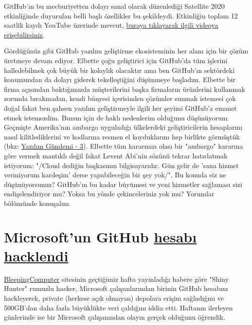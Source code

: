 \documentclass[11pt]{article}
\begin{document}
GitHub'ın bu mecburiyetten dolayı sanal olarak düzenlediği Satellite 2020
etkinliğinde duyurulan belli başlı özellikler bu şekildeydi. Etkinliğin toplam
12 saatlik kaydı YouTube üzerinde mevcut, \href{https://www.youtube.com/watch?v=FhZTPM9ysWk\&feature=emb\_title}{buraya tıklayarak ilgili videoya
erişebilirsiniz}.

Gördüğünüz gibi GitHub yazılım geliştirme ekosisteminin her alanı için bir
çözüm üretmeye devam ediyor. Elbette çoğu geliştirici için GitHub'da tüm
işlerini halledebilmek çok büyük bir kolaylık olacaktır ama ben GitHub'ın
sektördeki konumundan da dolayı giderek tekelleştiğini düşünmeye başladım.
Elbette bir firma açısından baktığımızda müşterilerini başka firmaların
ürünlerini kullanmak zorunda bırakmadan, kendi bünyesi içerisinden çözümler
sunmak istemesi çok doğal fakat ben şahsen yazılım geliştirmeyle ilgili her
şeyimi GitHub'a emanet etmek istemezdim. Bunun için de haklı nedenlerim
olduğunu düşünüyorum. Geçmişte Amerika'nın ambargo uyguladığı ülkelerdeki
geliştiricilerin hesaplarını nasıl kilitlediklerini ve kodlarına resmen el
koyduklarını hep birlikte görmüştük (bkz: \href{../../2019/03/yazilim-gundemi-03.pdf}{Yazılım Gündemi - 3}). Elbette tüm
kararınızı olası bir "ambargo" kararına göre vermek mantıklı değil fakat
Levent Abi'nin sözünü tekrar hatırlatmak istiyorum: "/Cloud dediğin başkasının
bilgisayarıdır. Gün gelir de 'sana hizmet vermiyorum kardeşim' derse
yapabileceğin bir şey yok/". Bu konuda siz ne düşünüyorsunuz? GitHub'ın bu
kadar büyümesi ve yeni hizmetler sağlaması sizi endişelendiriyor mu? Yoksa bu
yönde çekinceleriniz yok mu? Yorumlar bölümünde konuşalım.
\section{Microsoft'un GitHub \href{https://www.bleepingcomputer.com/news/security/microsofts-github-account-hacked-private-repositories-stolen/}{hesabı hacklendi}}
\label{sec:orgce755cb}
\href{https://www.bleepingcomputer.com/}{BleepingComputer} sitesinin geçtiğimiz hafta yayınladığı habere göre "Shiny
Hunter" rumuzlu hacker, Microsoft çalışanlarından birinin GitHub hesabını
hackleyerek, private (herkese açık olmayan) depolara erişim sağladığını ve
500GB'dan daha fazla büyüklükte veri çaldığını iddia etti. Haftanın ilerleyen
günlerinde ise bir Microsoft çalışanından olayın gerçek olduğunu öğrendik.
\end{document}
